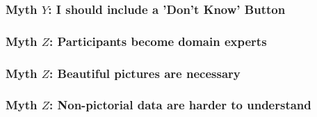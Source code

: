 \documentclass{sigchi}
\begin{document}

\subsubsection{Myth $Y$: I should include a 'Don't Know' Button}
\subsubsection{Myth $Z$: Participants become domain experts}
\subsubsection{Myth $Z$: Beautiful pictures are necessary}
\subsubsection{Myth $Z$: Non-pictorial data are harder to understand}
\end{document}
